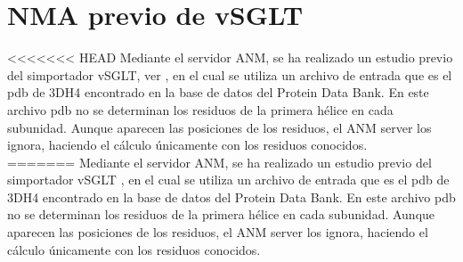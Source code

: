 \section{NMA previo de vSGLT}
<<<<<<< HEAD
Mediante el servidor ANM, se ha realizado un estudio previo del simportador vSGLT, ver \cite{Cabrera2017}, en el cual se utiliza un archivo de entrada que es el pdb de 3DH4 encontrado en la base de datos del Protein Data Bank. En este archivo pdb no se determinan los residuos de la primera h\'{e}lice en cada subunidad. Aunque aparecen las posiciones de los residuos, el ANM server los ignora, haciendo el c\'{a}lculo \'{u}nicamente con los residuos conocidos.\\
=======
Mediante el servidor ANM, se ha realizado un estudio previo del simportador vSGLT \cite{Cabrera2017}, en el cual se utiliza un archivo de entrada que es el pdb de 3DH4 encontrado en la base de datos del Protein Data Bank. En este archivo pdb no se determinan los residuos de la primera h\'{e}lice en cada subunidad. Aunque aparecen las posiciones de los residuos, el ANM server los ignora, haciendo el c\'{a}lculo \'{u}nicamente con los residuos conocidos.\\

